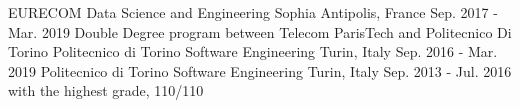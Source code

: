 \begin{cventries}
	\cventry
		{EURECOM}
		{ Data Science and Engineering}
		{Sophia Antipolis, France}
		{Sep. 2017 - Mar. 2019}
		{Double Degree program between Telecom ParisTech and Politecnico Di Torino}
	\cventry
		{Politecnico di Torino}
		{ Software Engineering}
		{Turin, Italy}
		{Sep. 2016 - Mar. 2019}
		{}
	\cventry
		{Politecnico di Torino}
		{ Software Engineering}
		{Turin, Italy}
		{Sep. 2013 - Jul. 2016}
		{with the highest grade, 110/110}
\end{cventries}
